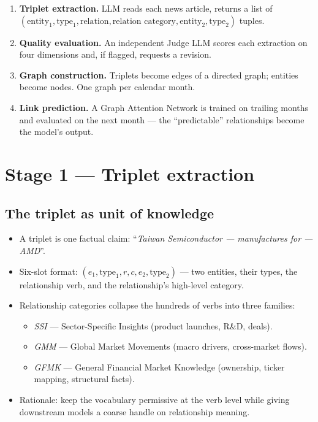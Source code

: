 \documentclass[11pt]{article}
\begin{document}
\begin{enumerate}
  \item \textbf{Triplet extraction.} LLM reads each news article, returns a list of \((\text{entity}_1, \text{type}_1, \text{relation}, \text{relation\ category}, \text{entity}_2, \text{type}_2)\) tuples.
  \item \textbf{Quality evaluation.} An independent Judge LLM scores each extraction on four dimensions and, if flagged, requests a revision.
  \item \textbf{Graph construction.} Triplets become edges of a directed graph; entities become nodes. One graph per calendar month.
  \item \textbf{Link prediction.} A Graph Attention Network is trained on trailing months and evaluated on the next month --- the ``predictable'' relationships become the model's output.
\end{enumerate}

\section{Stage 1 --- Triplet extraction}

\subsection{The triplet as unit of knowledge}
\begin{itemize}
  \item A triplet is one factual claim: ``\textit{Taiwan Semiconductor --- manufactures for --- AMD}''.
  \item Six-slot format: \((e_1, \text{type}_1, r, c, e_2, \text{type}_2)\) --- two entities, their types, the relationship verb, and the relationship's high-level category.
  \item Relationship categories collapse the hundreds of verbs into three families:
    \begin{itemize}
      \item \emph{SSI} --- Sector-Specific Insights (product launches, R\&D, deals).
      \item \emph{GMM} --- Global Market Movements (macro drivers, cross-market flows).
      \item \emph{GFMK} --- General Financial Market Knowledge (ownership, ticker mapping, structural facts).
    \end{itemize}
  \item Rationale: keep the vocabulary permissive at the verb level while giving downstream models a coarse handle on relationship meaning.
\end{itemize}
\end{document}
